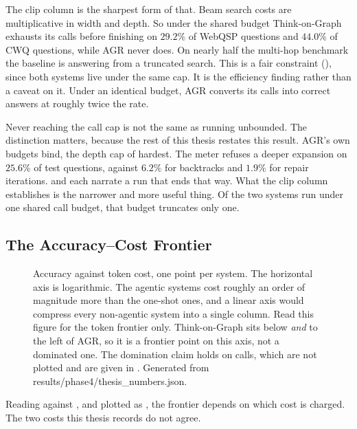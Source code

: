 The clip column is the sharpest form of that. Beam search costs are
multiplicative in width and depth. So under the shared budget Think-on-Graph
exhausts its calls before finishing on $29.2\%$ of WebQSP questions and $44.0\%$
of CWQ questions, while AGR never does. On nearly half the multi-hop benchmark
the baseline is answering from a truncated search. This is a fair constraint
(), since both systems live under the same cap. It is the
efficiency finding rather than a caveat on it. Under an identical budget, AGR
converts its calls into correct answers at roughly twice the rate.

Never reaching the call cap is not the same as running unbounded. The
distinction matters, because the rest of this thesis restates this result. AGR's
own budgets bind, the depth cap of  hardest. The meter refuses
a deeper expansion on $25.6\%$ of test questions, against $6.2\%$ for backtracks
and $1.9\%$ for repair iterations.  and
 each narrate a run that ends that way. What the clip
column establishes is the narrower and more useful thing. Of the two systems run
under one shared call budget, that budget truncates only one.

\subsection{The Accuracy--Cost Frontier}

\begin{figure}[!tb]
  \begin{center}
    
  \end{center}
  \caption[Accuracy against token cost]{Accuracy against token cost, one point
  per system. The horizontal axis is logarithmic. The agentic systems cost
  roughly an order of magnitude more than the one-shot ones, and a linear axis
  would compress every non-agentic system into a single column. Read this figure
  for the token frontier only. Think-on-Graph sits below \emph{and} to the left
  of AGR, so it is a frontier point on this axis, not a dominated one. The
  domination claim holds on calls, which are not plotted and are given in
  . Generated from
  \textsf{results/phase4/thesis\_numbers.json}.}
  \label{fig:accuracy-cost}
\end{figure}

Reading  against , and plotted
as , the frontier depends on which cost is
charged. The two costs this thesis records do not agree.

